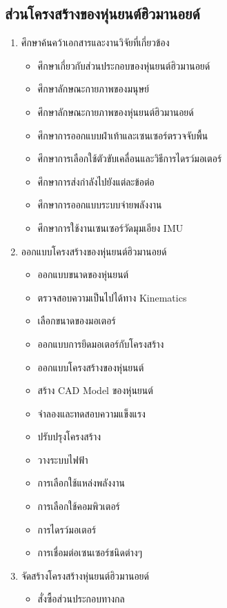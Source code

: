 \subsection{ส่วนโครงสร้างของหุ่นยนต์ฮิวมานอยด์}
\begin{enumerate}[label=\arabic*, leftmargin=1.5cm]
	\item ศึกษาค้นคว้าเอกสารและงานวิจัยที่เกี่ยวข้อง
	\begin{itemize}
		\setlength\itemsep{-0.3em}
		\item ศึกษาเกี่ยวกับส่วนประกอบของหุ่นยนต์ฮิวมานอยด์
		\item ศึกษาลักษณะกายภาพของมนุษย์
		\item ศึกษาลักษณะกายภาพของหุ่นยนต์ฮิวมานอยด์
		\item ศึกษาการออกแบบฝ่าเท้าและเซนเซอร์ตรวจจับพื้น
		\item ศึกษาการเลือกใช้ตัวขับเคลื่อนและวิธีการไดรว์มอเตอร์
		\item ศึกษาการส่งกำลังไปยังแต่ละข้อต่อ
		\item ศึกษาการออกแบบระบบจ่ายพลังงาน
		\item ศึกษาการใช้งานเซนเซอร์วัดมุมเอียง IMU
	\end{itemize}
	\item ออกแบบโครงสร้างของหุ่นยนต์ฮิวมานอยด์
	\begin{itemize}\setlength\itemsep{-0.3em}
		\item ออกแบบขนาดของหุ่นยนต์
		\item ตรวจสอบความเป็นไปได้ทาง Kinematics
		\item เลือกขนาดของมอเตอร์
		\item ออกแบบการยึดมอเตอร์กับโครงสร้าง
		\item ออกแบบโครงสร้างของหุ่นยนต์
		\item สร้าง CAD Model ของหุ่นยนต์
		\item จำลองและทดสอบความแข็งแรง
		\item ปรับปรุงโครงสร้าง
		\item วางระบบไฟฟ้า
		\item การเลือกใช้แหล่งพลังงาน
		\item การเลือกใช้คอมพิวเตอร์
		\item การไดรว์มอเตอร์
		\item การเชื่อมต่อเซนเซอร์ชนิดต่างๆ
	\end{itemize}
	\item จัดสร้างโครงสร้างหุ่นยนต์ฮิวมานอยด์
	\begin{itemize}\setlength\itemsep{-0.3em}
		\item สั่งซื้อส่วนประกอบทางกล

\end{itemize}
\end{enumerate}

